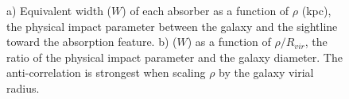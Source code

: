 \documentclass[iop]{emulateapj-rtx4}
\begin{document}
\begin{figure}[ht!]
  \centering
  \caption{a) Equivalent width ($W$) of each absorber as a function of $\rho$ (kpc), the physical impact parameter between the galaxy and the sightline toward the absorption feature. b) ($W$) as a function of $\rho/R_{vir}$, the ratio of the physical impact parameter and the galaxy diameter. The anti-correlation is strongest when scaling $\rho$ by the galaxy virial radius.}
 \label{ew_both}
\end{figure}
\vspace{10pt}
\end{document}
